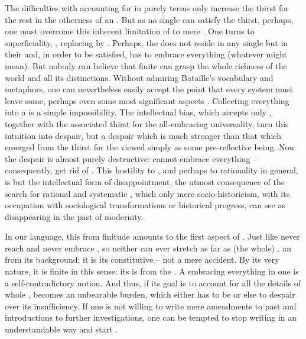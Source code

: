 \pa The difficulties with accounting for  in purely
 terms only increase the thirst for the rest in the otherness of
an . But as no single  can satisfy the thirst, perhaps,
one must overcome this inherent limitation of  to mere
. One turns to superficiality, , replacing
 by .  Perhaps, the  does not reside in
any single  but in their  and, in order to be satisfied,
 has to embrace everything (whatever  might mean).
But nobody can believe that finite  can grasp the whole richness
of the world and all its distinctions.
Without admiring Bataille's vocabulary and metaphors, one can nevertheless
easily accept the point that every system must leave some, perhaps even some
most significant aspects . Collecting everything into a
 is a simple impossibility.  The intellectual bias,
which accepts only , together with the associated
thirst for the all-embracing universality, turn this intuition into despair, but
a despair which is much stronger than that which emerged from the thirst for the
 viewed simply as some pre-reflective being. Now the despair
is almost purely destructive:  cannot embrace everything --
consequently, get rid of . This  hostility to
, and perhaps to rationality in general, is but the intellectual
form of  disappointment, the utmost consequence of the search for
rational  and systematic , which only mere
socio-historicism, with its occupation with sociological transformations or
historical progress, can see as disappearing in the past of modernity.

In our language, this  from finitude amounts to the first aspect
of .  Just like  never reach
 and  never embrace , so neither can
 ever stretch as far as (the whole) .
  an  from its background; it is its
constitutive  -- not a mere accident. By its very nature, it is
finite in this sense: its  is  from the . A
 embracing everything in one  is a self-contradictory
notion.  And thus, if its goal is to account for all the details of whole
,  becomes an unbearable burden, which either has
to be  or else to despair over its insufficiency. If one is not
willing to write mere amendments to past and introductions to further
investigations, one can be tempted to stop writing in an understandable way and
start .

